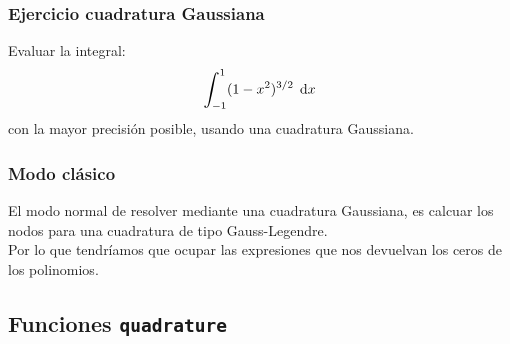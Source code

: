 \documentclass[12pt]{beamer}
\begin{document}
\begin{frame}
\frametitle{Ejercicio cuadratura Gaussiana}
Evaluar la integral:
\begin{align*}
\scaleint{6ex}_{\bs -1}^{1} (1 - x^{2})^{3/2} \; \dd{x}
\end{align*}
con la mayor precisión posible, usando una cuadratura Gaussiana.
\end{frame}
\begin{frame}
\frametitle{Modo clásico}
El modo normal de resolver mediante una cuadratura Gaussiana, es calcuar los nodos para una cuadratura de tipo Gauss-Legendre.
\\
\bigskip
\pause
Por lo que tendríamos que ocupar las expresiones que nos devuelvan los ceros de los polinomios. 
\end{frame}

\subsection{Funciones \texttt{quadrature}}
\end{document}
